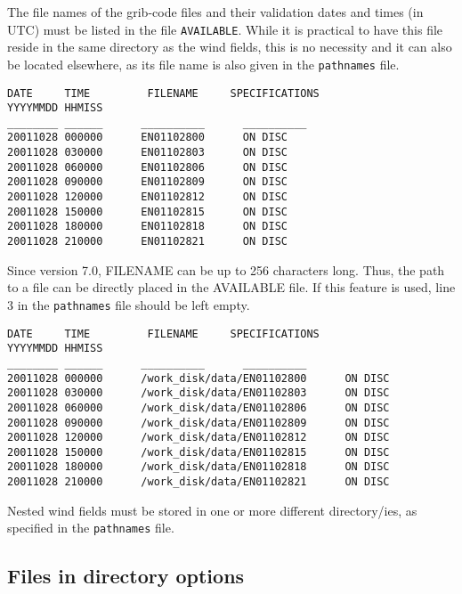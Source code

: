 \documentclass{egu}                  %
\begin{document}
The file names of the grib-code files and their validation dates and times (in UTC) must be listed in the file \verb|AVAILABLE|. While it is practical to have this file reside in the same directory as the wind fields, this is no necessity and it can also be located elsewhere, as its file name is also given in the \verb|pathnames| file.
\begin{footnotesize}\begin{verbatim}
DATE     TIME         FILENAME     SPECIFICATIONS
YYYYMMDD HHMISS
________ ______      __________      __________
20011028 000000      EN01102800      ON DISC
20011028 030000      EN01102803      ON DISC
20011028 060000      EN01102806      ON DISC
20011028 090000      EN01102809      ON DISC
20011028 120000      EN01102812      ON DISC
20011028 150000      EN01102815      ON DISC
20011028 180000      EN01102818      ON DISC
20011028 210000      EN01102821      ON DISC
\end{verbatim}\end{footnotesize}

Since version 7.0, FILENAME can be up to 256 characters long.  Thus, the path
to a file can be directly placed in the AVAILABLE file.  If this feature is
used, line 3 in the \verb|pathnames| file should be left empty.
\begin{footnotesize}\begin{verbatim}
DATE     TIME         FILENAME     SPECIFICATIONS
YYYYMMDD HHMISS
________ ______      __________      __________
20011028 000000      /work_disk/data/EN01102800      ON DISC
20011028 030000      /work_disk/data/EN01102803      ON DISC
20011028 060000      /work_disk/data/EN01102806      ON DISC
20011028 090000      /work_disk/data/EN01102809      ON DISC
20011028 120000      /work_disk/data/EN01102812      ON DISC
20011028 150000      /work_disk/data/EN01102815      ON DISC
20011028 180000      /work_disk/data/EN01102818      ON DISC
20011028 210000      /work_disk/data/EN01102821      ON DISC
\end{verbatim}\end{footnotesize}

Nested wind fields must be stored in one or more different directory/ies, as specified in the \verb|pathnames| file.

\newpage

\subsection{Files in directory options}
\end{document}
